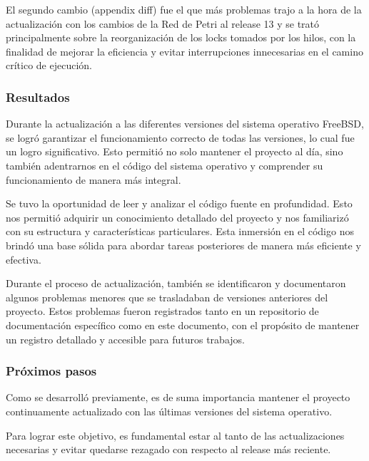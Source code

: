 El segundo cambio (appendix diff) fue el que más problemas trajo a la hora de la actualización con los cambios de la Red de Petri al release 13 y se trató principalmente sobre la reorganización de los locks tomados por los hilos, con la finalidad de mejorar la eficiencia y evitar interrupciones innecesarias en el camino crítico de ejecución.\par


\subsubsection{Resultados}

Durante la actualización a las diferentes versiones del sistema operativo FreeBSD, se logró garantizar el funcionamiento correcto de todas las versiones, lo cual fue un logro significativo. Esto permitió no solo mantener el proyecto al día, sino también adentrarnos en el código del sistema operativo y comprender su funcionamiento de manera más integral.\par

Se tuvo la oportunidad de leer y analizar el código fuente en profundidad. Esto nos permitió adquirir un conocimiento detallado del proyecto y nos familiarizó con su estructura y características particulares. Esta inmersión en el código nos brindó una base sólida para abordar tareas posteriores de manera más eficiente y efectiva.\par

Durante el proceso de actualización, también se identificaron y documentaron algunos problemas menores que se trasladaban de versiones anteriores del proyecto. Estos problemas fueron registrados tanto en un repositorio de documentación específico como en este documento, con el propósito de mantener un registro detallado y accesible para futuros trabajos.\par


\subsubsection{Próximos pasos}

Como se desarrolló previamente, es de suma importancia mantener el proyecto continuamente actualizado con las últimas versiones del sistema operativo.\par

Para lograr este objetivo, es fundamental estar al tanto de las actualizaciones necesarias y evitar quedarse rezagado con respecto al release más reciente.\par


